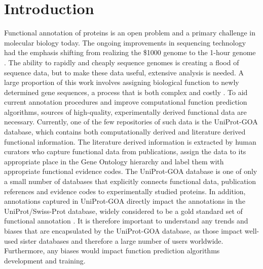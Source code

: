 \documentclass[12pt]{article}
\begin{document}
\section*{Introduction}

Functional annotation of proteins is an open problem and a primary challenge in molecular
biology today\cite{Friedberg2006Automated, Schnoes2009Annotation, Erdin2011180,
Rentzsch2009210}. The ongoing improvements in sequencing technology had the
emphasis shifting from realizing the \$1000 genome to the 1-hour genome
\cite{Stahl2012Toward}. The ability to rapidly and cheaply sequence genomes is creating a
flood of sequence data, but to make these data useful, extensive analysis is needed. A large
proportion of this work involves assigning biological function to newly determined gene
sequences, a process that is both complex and costly \cite{Sboner2011Real}.  To aid current
annotation procedures and improve computational function prediction algorithms, sources of
high-quality, experimentally derived functional data are necessary. Currently, one of the
few repositories of such data is the UniProt-GOA database\cite{Dimmer2012UniProtGO}, which
contains both computationally derived and literature derived functional information. The
literature derived information is extracted by human curators who capture functional data
from publications, assign the data to its appropriate place in the Gene Ontology
hierarchy\cite{Ashburner2000Gene} and label them with appropriate functional evidence codes.
The UniProt-GOA database is one of only a small number of databases that explicitly connects
functional data, publication references and evidence codes to experimentally studied
proteins.  In addition, annotations captured in UniProt-GOA directly impact the annotations
in the UniProt/Swiss-Prot database, widely considered to be a gold standard set of
functional annotation \cite{Schnoes2009Annotation}.  It is therefore important to understand
any trends and biases that are encapsulated by the UniProt-GOA database, as those impact
well-used sister databases and therefore a large number of users worldwide. Furthermore, any
biases would impact function prediction algorithms development and training.
\end{document}
